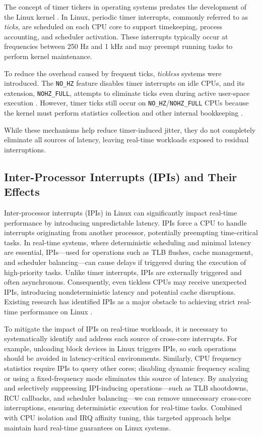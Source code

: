 \documentclass[letterpaper]{article}
\begin{document}
The concept of timer tickers in operating systems predates the development of the Linux kernel \cite{Corbet}. 
In Linux, periodic timer interrupts, commonly referred to as \emph{ticks}, are scheduled on each CPU core 
to support timekeeping, process accounting, and scheduler activation. These interrupts typically occur at 
frequencies between 250 Hz and 1 kHz and may preempt running tasks to perform kernel maintenance.  

To reduce the overhead caused by frequent ticks, \emph{tickless} systems were introduced. 
The \texttt{NO\_HZ} feature disables timer interrupts on idle CPUs, and its extension, 
\texttt{NOHZ\_FULL}, attempts to eliminate ticks even during active user-space execution \cite{KernelDocNOHZ}. 
However, timer ticks still occur on \texttt{NO\_HZ}/\texttt{NOHZ\_FULL} CPUs because the kernel must perform 
statistics collection and other internal bookkeeping \cite{stackoverflow}.  

While these mechanisms help reduce timer-induced jitter, they do not completely eliminate all sources of latency, 
leaving real-time workloads exposed to residual interruptions.


\subsection{Inter-Processor Interrupts (IPIs) and Their Effects}

Inter-processor interrupts (IPIs) in Linux can significantly impact real-time performance by introducing 
unpredictable latency. IPIs force a CPU to handle interrupts originating from another processor, 
potentially preempting time-critical tasks. In real-time systems, where deterministic scheduling and 
minimal latency are essential, IPIs—used for operations such as TLB flushes, cache management, 
and scheduler balancing—can cause delays if triggered during the execution of high-priority tasks. 
Unlike timer interrupts, IPIs are externally triggered and often asynchronous. Consequently, even 
tickless CPUs may receive unexpected IPIs, introducing nondeterministic latency and potential cache 
disruptions. Existing research has identified IPIs as a major obstacle to achieving strict real-time 
performance on Linux \cite{YuxinRen}.  

To mitigate the impact of IPIs on real-time workloads, it is necessary to systematically identify and 
address each source of cross-core interrupts. For example, unloading block devices in Linux triggers 
IPIs, so such operations should be avoided in latency-critical environments. Similarly, CPU frequency 
statistics require IPIs to query other cores; disabling dynamic frequency scaling or using a fixed-frequency 
mode eliminates this source of latency. By analyzing and selectively suppressing IPI-inducing operations—such as 
TLB shootdowns, RCU callbacks, and scheduler balancing—we can remove unnecessary cross-core interruptions, 
ensuring deterministic execution for real-time tasks. Combined with CPU isolation and IRQ affinity tuning, 
this targeted approach helps maintain hard real-time guarantees on Linux systems.
\end{document}
